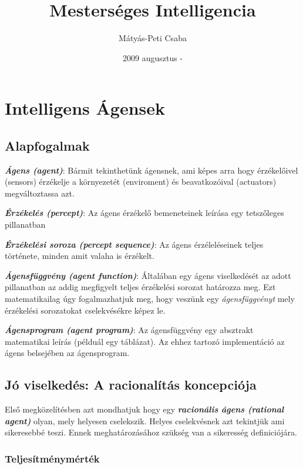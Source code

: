 \documentclass[a4paper,10pt]{scrbook}
\begin{document}
\author{Mátyás-Peti Csaba}
\title{Mesterséges Intelligencia}
\date{2009 augusztus - }

\frontmatter
\tableofcontents

\mainmatter 

\chapter{Intelligens Ágensek}

\section{Alapfogalmak}

\textbf{\emph{Ágens (agent)}}: Bármit tekinthetünk ágensnek, ami képes arra hogy érzékelőivel 
(sensors) érzékelje a környezetét (enviroment) és beavatkozóival (actuators)
megváltoztassa azt. 

\bigskip
\noindent
\textbf{\emph{Érzékelés (percept)}}: Az ágens érzékelő bemeneteinek leírása egy 
tetszőleges pillanatban

\bigskip
\noindent
\textbf{\emph{Érzékelési soroza (percept sequence)}}: Az ágens érzéleléseinek teljes 
története, minden amit valaha is érzékelt. 

\bigskip
\noindent
\textbf{\emph{Ágensfüggvény (agent function)}}: Általában egy ágens viselkedését az adott 
pillanatban az addig megfigyelt teljes érzékelési sorozat határozza meg. Ezt 
matematikailag úgy fogalmazhatjuk meg, hogy veszünk egy \emph{ágensfüggvényt} mely 
érzékelési sorozatokat cselekvésékre képez le. 

\bigskip
\noindent 
\textbf{\emph{Ágensprogram (agent program)}}: Az ágensfüggvény egy absztrakt matematikai leírás 
(példuál egy táblázat). Az ehhez tartozó implementáció az ágens belsejében az ágensprogram.

\section{Jó viselkedés: A racionalítás koncepciója}

Első megközelítésben azt mondhatjuk hogy egy \textbf{\emph{racionális ágens (rational agent)}} 
olyan, mely helyesen cselekszik. Helyes cselekvésnek azt tekintjük ami sikeresebbé teszi. 
Ennek meghatározásához szükség van a sikeresség definiciójára. 

\subsection{Teljesítménymérték}
\end{document}
